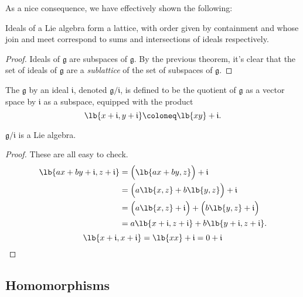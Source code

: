\documentclass{article}
\DeclarePairedDelimiter\lb\lbrack\rbrack
\newcommand*\frkg{{\ensuremath{\mathfrak{g}}}}
\newcommand*\frki{{\ensuremath{\mathfrak{i}}}}
\begin{document}
As a nice consequence, we have effectively shown the following:

\begin{proposition}
    \label{thm:IdealLattice}
    Ideals of a Lie algebra form a lattice, with order given by containment and whose join and meet correspond to sums and intersections of ideals respectively.
\end{proposition}

\begin{proof}
    Ideals of $\frkg$ are subspaces of $\frkg$.
    By the previous theorem, it's clear that the set of ideals of $\frkg$ are a \textit{sublattice} of the set of subspaces of $\frkg$.

\end{proof}

\begin{definition}
    The  $\frkg$ by an ideal $\frki$, denoted $\frkg/\frki$, is defined to be the quotient of $\frkg$ as a vector space by $\frki$ as a subspace, equipped with the product
    \[
        \lb{x+\frki,y+\frki}
        \coloneq
        \lb{xy} + \frki.
    \]
\end{definition}

\begin{proposition}
    $\frkg/\frki$ is a Lie algebra.
\end{proposition}
\begin{proof}
    These are all easy to check.
    \begin{align*}
        \lb{ax+by+\frki,z+\frki}
        &=
        \Big(\lb{ax+by,z}\Big) + \frki
        \\\
        &=
        \Big(
            a\lb{x,z}  
            +
            b\lb{y,z}  
        \Big)
        + \frki
        \\
        &=
        \Big(
            a\lb{x,z} + \frki
        \Big)
        +
        \Big(
            b\lb{y,z} + \frki 
        \Big)
        \\
        &=
        a\lb{x+\frki,z+\frki} + b\lb{y+\frki,z+\frki}.
    \end{align*}
    \[
        \lb{x+\frki,x+\frki}
        =
        \lb{xx} + \frki
        =
        0 + \frki
    \]
\end{proof}

\newcommand{\barphi}{\ensuremath{\overline{\phi}}}

\subsection{Homomorphisms}
\end{document}
